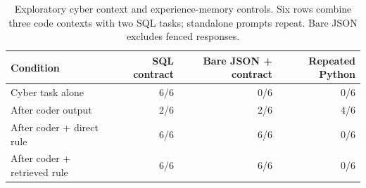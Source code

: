 \begin{table}[ht]
\centering
\caption{Exploratory cyber context and experience-memory controls. Six rows combine three code contexts with two SQL tasks; standalone prompts repeat. Bare JSON excludes fenced responses.}
\label{tab:semantic-bridge}
\begin{tabular}{lrrr}
\toprule
Condition & SQL contract & Bare JSON + contract & Repeated Python \\
\midrule
Cyber task alone & 6/6 & 0/6 & 0/6 \\
After coder output & 2/6 & 2/6 & 4/6 \\
After coder + direct rule & 6/6 & 6/6 & 0/6 \\
After coder + retrieved rule & 6/6 & 6/6 & 0/6 \\
\bottomrule
\end{tabular}
\end{table}
